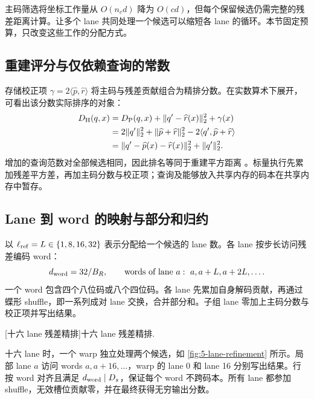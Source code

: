 主码筛选将坐标工作量从 $O(n_cd)$ 降为 $O(cd)$，但每个保留候选仍需完整的残差距离计算。让多个 lane 共同处理一个候选可以缩短各 lane 的循环。本节固定预算，只改变这些工作的分配方式。

\subsection{重建评分与仅依赖查询的常数}

存储校正项 $\gamma=2\langle\widehat p,\widehat r\rangle$ 将主码与残差贡献组合为精排分数。在实数算术下展开，可看出该分数实际排序的对象：
\begin{align}
 D_{\mathrm{H}}(q,x)
 &=D_{\mathrm{P}}(q,x)+\|q'-\widehat r(x)\|_2^2+\gamma(x)
 \label{eq:5-refined-score}\\
 &=2\|q'\|_2^2+\|\widehat p+\widehat r\|_2^2-2\langle q',\widehat p+\widehat r\rangle\nonumber\\
 &=\|q'-\widehat p(x)-\widehat r(x)\|_2^2+\|q'\|_2^2.
 \label{eq:5-refined-constant}
\end{align}
增加的查询范数对全部候选相同，因此排名等同于重建平方距离 \cite{jhq}。标量执行先累加残差平方差，再加主码分数与校正项；查询及能够放入共享内存的码本在共享内存中暂存。

\subsection{Lane 到 word 的映射与部分和归约}

以 $\ell_{\mathrm{ref}}=L\in\{1,8,16,32\}$ 表示分配给一个候选的 lane 数。各 lane 按步长访问残差编码 word：
\[
 d_{\rm word}=32/B_R,\qquad
 \text{words of lane }a:\ a,a+L,a+2L,\ldots.
\]
一个 word 包含四个八位码或八个四位码。各 lane 先累加自身解码贡献，再通过蝶形 shuffle，即一系列成对 lane 交换，合并部分和。子组 lane 零加上主码分数与校正项并写出结果。

\par\medskip\noindent\begin{minipage}{\linewidth}
\captionsetup{hypcap=false}
\centering

[十六 lane 残差精排]{十六 lane 残差精排.}
\label{fig:5-lane-refinement}
\end{minipage}\par\medskip
十六 lane 时，一个 warp 独立处理两个候选，如 \cref{fig:5-lane-refinement} 所示。局部 lane $a$ 访问 words $a,a+16,\ldots$，warp 的 lane 0 和 lane 16 分别写出结果。行按 word 对齐且满足 $d_{\rm word}\mid D_s$，保证每个 word 不跨码本。所有 lane 都参加 shuffle，无效槽位贡献零，并在最终获得无穷输出分数。

